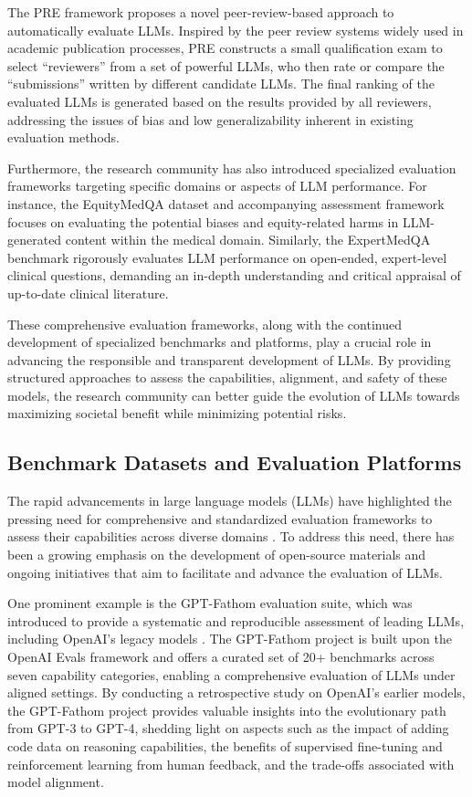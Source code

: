 \documentclass[11pt]{article}
\begin{document}
The PRE \cite{ref80} framework proposes a novel peer-review-based approach to automatically evaluate LLMs. Inspired by the peer review systems widely used in academic publication processes, PRE constructs a small qualification exam to select ``reviewers'' from a set of powerful LLMs, who then rate or compare the ``submissions'' written by different candidate LLMs. The final ranking of the evaluated LLMs is generated based on the results provided by all reviewers, addressing the issues of bias and low generalizability inherent in existing evaluation methods.

Furthermore, the research community has also introduced specialized evaluation frameworks targeting specific domains or aspects of LLM performance. For instance, the EquityMedQA dataset and accompanying assessment framework \cite{ref81} focuses on evaluating the potential biases and equity-related harms in LLM-generated content within the medical domain. Similarly, the ExpertMedQA benchmark \cite{ref82} rigorously evaluates LLM performance on open-ended, expert-level clinical questions, demanding an in-depth understanding and critical appraisal of up-to-date clinical literature.

These comprehensive evaluation frameworks, along with the continued development of specialized benchmarks and platforms, play a crucial role in advancing the responsible and transparent development of LLMs. By providing structured approaches to assess the capabilities, alignment, and safety of these models, the research community can better guide the evolution of LLMs towards maximizing societal benefit while minimizing potential risks.

\subsection{Benchmark Datasets and Evaluation Platforms}

The rapid advancements in large language models (LLMs) have highlighted the pressing need for comprehensive and standardized evaluation frameworks to assess their capabilities across diverse domains \cite{ref61}. To address this need, there has been a growing emphasis on the development of open-source materials and ongoing initiatives that aim to facilitate and advance the evaluation of LLMs.

One prominent example is the GPT-Fathom evaluation suite, which was introduced to provide a systematic and reproducible assessment of leading LLMs, including OpenAI's legacy models \cite{ref83}. The GPT-Fathom project is built upon the OpenAI Evals framework and offers a curated set of 20+ benchmarks across seven capability categories, enabling a comprehensive evaluation of LLMs under aligned settings. By conducting a retrospective study on OpenAI's earlier models, the GPT-Fathom project provides valuable insights into the evolutionary path from GPT-3 to GPT-4, shedding light on aspects such as the impact of adding code data on reasoning capabilities, the benefits of supervised fine-tuning and reinforcement learning from human feedback, and the trade-offs associated with model alignment.
\end{document}
